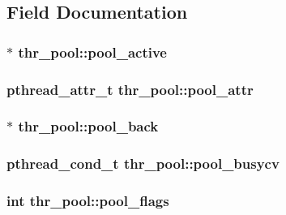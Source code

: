\subsection{Field Documentation}
\hypertarget{structthr__pool_a22cb592fd33f720c56b20a726deb5d2a}{
\subsubsection[{pool\_\-active}]{$\ast$ {\bf thr\_\-pool::pool\_\-active}}}
\label{structthr__pool_a22cb592fd33f720c56b20a726deb5d2a}
\hypertarget{structthr__pool_ad0681ae3f8bda7f85b669bf7940777ef}{
\subsubsection[{pool\_\-attr}]{\setlength{\rightskip}{0pt plus 5cm}pthread\_\-attr\_\-t {\bf thr\_\-pool::pool\_\-attr}}}
\label{structthr__pool_ad0681ae3f8bda7f85b669bf7940777ef}
\hypertarget{structthr__pool_aa5d3015bfd8e1a18ccb9bc5017d40135}{
\subsubsection[{pool\_\-back}]{$\ast$ {\bf thr\_\-pool::pool\_\-back}}}
\label{structthr__pool_aa5d3015bfd8e1a18ccb9bc5017d40135}
\hypertarget{structthr__pool_aedcb82844d345ef36cff542809203824}{
\subsubsection[{pool\_\-busycv}]{\setlength{\rightskip}{0pt plus 5cm}pthread\_\-cond\_\-t {\bf thr\_\-pool::pool\_\-busycv}}}
\label{structthr__pool_aedcb82844d345ef36cff542809203824}
\hypertarget{structthr__pool_af8063de86663bedc6827513d88e8b848}{
\subsubsection[{pool\_\-flags}]{\setlength{\rightskip}{0pt plus 5cm}int {\bf thr\_\-pool::pool\_\-flags}}}
